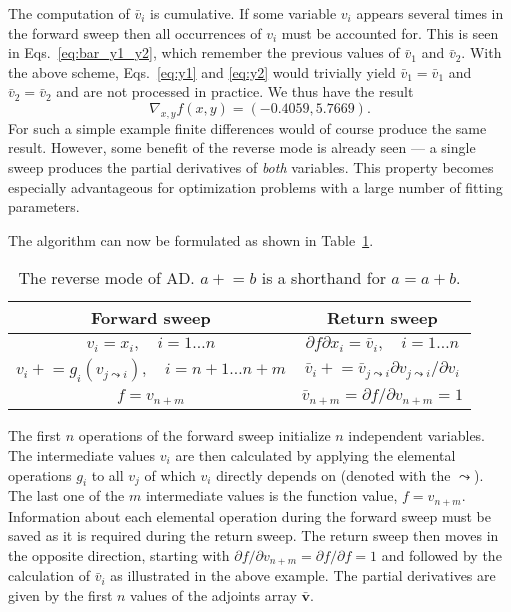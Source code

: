 \documentclass{article}
\begin{document}
The computation of $\bar v_i$ is cumulative. If some variable $v_i$ appears several times in the forward sweep then all occurrences of $v_i$ must be accounted for. This is seen in Eqs.~\eqref{eq:bar_y1_y2}, which remember the previous values of $\bar v_1$ and $\bar v_2$. With the above scheme, Eqs.~\eqref{eq:y1} and \eqref{eq:y2} would trivially yield $\bar v_1 = \bar v_1$ and $\bar v_2 = \bar v_2$ and are not processed in practice. We thus have the result
\begin{equation}
  \label{eq:Fgrad}
  \nabla_{x,y} f(x,y) = (-0.4059,5.7669).
\end{equation}
For such a simple example finite differences would of course produce the same result. However, some benefit of the reverse mode is already seen --- a single sweep produces the partial derivatives of \textit{both} variables. This property becomes especially advantageous for optimization problems with a large number of fitting parameters.

The algorithm can now be formulated as shown in Table~\ref{tab:AD}.
\begin{table}[h]
  \centering
  \caption{The reverse mode of AD. $a\mathrel{+}=b$ is a shorthand for
    $a = a + b$.}
  \begin{tabular}{c|c}
    Forward sweep & Return sweep \\ \hline
    $v_i = x_i, \quad i=1\ldots n$ & $\partial f\partial x_i = \bar
                                     v_i, \quad i=1\ldots n$ \\
    $v_i \mathrel{+}= g_i(v_{j \leadsto i}), \quad i=n+1\ldots n+m$
                  & $\bar v_i \mathrel{+}= \bar v_{j \leadsto
                    i} \partial v_{j \leadsto i}/\partial v_i$ \\
    $f = v_{n+m}$ & $\bar v_{n+m} = \partial f/\partial v_{n+m} = 1$
  \end{tabular}
  \label{tab:AD}
\end{table}
The first $n$ operations of the forward sweep initialize $n$ independent variables. The intermediate values $v_i$ are then calculated by applying the elemental operations $g_i$ to all $v_j$ of which $v_i$ directly depends on (denoted with the $\leadsto$). The last one of the $m$ intermediate values is the function value, $f = v_{n+m}$. Information about each elemental operation during the forward sweep must be saved as it is required during the return sweep. The return sweep then moves in the opposite direction, starting with $\partial f/\partial v_{n+m} = \partial f/\partial f = 1$ and followed by the calculation of $\bar v_i$ as illustrated in the above example. The partial derivatives are given by the first $n$ values of the adjoints array $\bm{\bar v}$.
\end{document}

